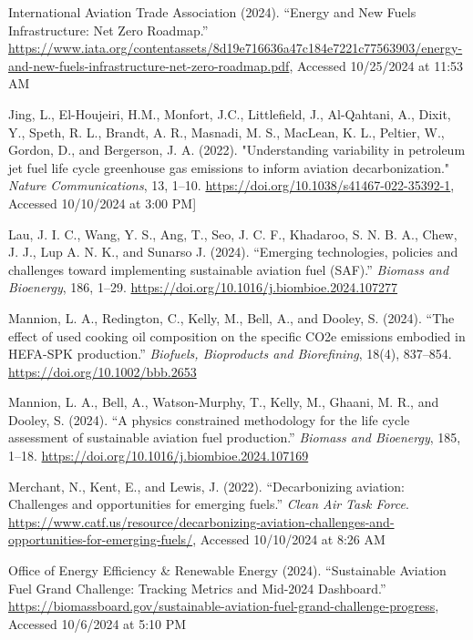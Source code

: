 \documentclass[12pt]{article}
\begin{document}
\begin{Appendix}
\begin{description}
    \item International Aviation Trade Association (2024). “Energy and New Fuels Infrastructure: Net Zero Roadmap.” \url{https://www.iata.org/contentassets/8d19e716636a47c184e7221c77563903/energy-and-new-fuels-infrastructure-net-zero-roadmap.pdf}, Accessed 10/25/2024 at 11:53 AM

\item[] Jing, L., El-Houjeiri, H.M., Monfort, J.C., Littlefield, J., Al-Qahtani, A., Dixit, Y., Speth, R. L., Brandt, A. R., Masnadi, M. S., MacLean, K. L., Peltier, W., Gordon, D., and Bergerson, J. A. (2022). "Understanding variability in petroleum jet fuel life cycle greenhouse gas emissions to inform aviation decarbonization." \textit{Nature Communications}, 13, 1–10. \url{https://doi.org/10.1038/s41467-022-35392-1}, Accessed 10/10/2024 at 3:00 PM]
    
    \item Lau, J. I. C., Wang, Y. S., Ang, T., Seo, J. C. F., Khadaroo, S. N. B. A., Chew, J. J., Lup A. N. K., and Sunarso J. (2024). “Emerging technologies, policies and challenges toward implementing sustainable aviation fuel (SAF).” \textit{Biomass and Bioenergy}, 186, 1–29. \url{https://doi.org/10.1016/j.biombioe.2024.107277}
    
    \item Mannion, L. A., Redington, C., Kelly, M., Bell, A., and Dooley, S. (2024). “The effect of used cooking oil composition on the specific CO2e emissions embodied in HEFA-SPK production.” \textit{Biofuels, Bioproducts and Biorefining}, 18(4), 837–854. \url{https://doi.org/10.1002/bbb.2653}
    
    \item Mannion, L. A., Bell, A., Watson-Murphy, T., Kelly, M., Ghaani, M. R., and Dooley, S. (2024). “A physics constrained methodology for the life cycle assessment of sustainable aviation fuel production.” \textit{Biomass and Bioenergy}, 185, 1–18. \url{https://doi.org/10.1016/j.biombioe.2024.107169}
    
    \item Merchant, N., Kent, E., and Lewis, J. (2022). “Decarbonizing aviation: Challenges and opportunities for emerging fuels.” \textit{Clean Air Task Force}. \url{https://www.catf.us/resource/decarbonizing-aviation-challenges-and-opportunities-for-emerging-fuels/}, Accessed 10/10/2024 at 8:26 AM
    
    \item Office of Energy Efficiency & Renewable Energy (2024). “Sustainable Aviation Fuel Grand Challenge: Tracking Metrics and Mid-2024 Dashboard.” \url{https://biomassboard.gov/sustainable-aviation-fuel-grand-challenge-progress}, Accessed 10/6/2024 at 5:10 PM
    

\end{description}
\end{Appendix}
\end{document}
